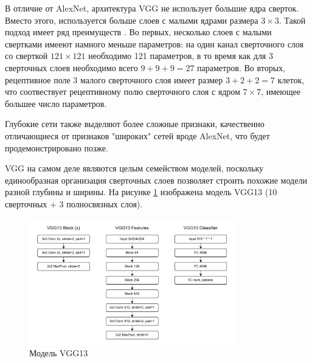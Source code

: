 В отличие от AlexNet, архитектура VGG не использует большие ядра сверток.
Вместо этого, используется больше слоев с малыми ядрами размера $3 \times 3$.
Такой подход имеет ряд преимуществ \cite{vggnet}. Во первых, несколько слоев с малыми свертками имееют намного меньше параметров: на один канал сверточного слоя со сверткой $121 \times 121$ необходимо 121 параметров, в то время как для 3 сверточных слоев необходимо всего $9 + 9 + 9 = 27$ параметров.
Во вторых, рецептивное поле 3 малого сверточного слоя имеет размер $3 + 2 + 2 = 7$ клеток, что соотвествует рецептивному полю сверточного слоя с ядром $7 \times 7$, имеющее большее число параметров.

Глубокие сети также выделяют более сложные признаки, качественно отличающиеся от признаков "широких" сетей вроде AlexNet, что будет продемонстрировано позже.

VGG на самом деле являются целым семейством моделей, поскольку единообразная организация сверточных слоев позволяет строить похожие модели разной глубины и ширины.
На рисунке \ref{fig:vgg13} изображена модель VGG13 (10 сверточных + 3 полносвязных слоя).
\begin{figure}[h]
    \centering
    \includegraphics[width=0.8\textwidth]{images/vgg13_model.pdf}
    \caption{Модель VGG13}
    \label{fig:vgg13}
\end{figure}

